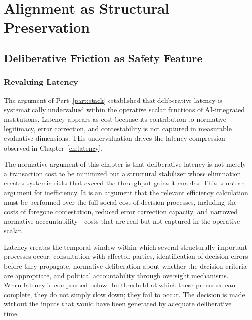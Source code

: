 \documentclass[12pt, oneside]{book}
\theoremstyle{plain}
\theoremstyle{definition}
\theoremstyle{remark}
\theoremstyle{definition}
\begin{document}
\part{Alignment as Structural Preservation}
\label{part:preservation}

\chapter{Deliberative Friction as Safety Feature}
\label{ch:friction}

\section{Revaluing Latency}

The argument of Part~\ref{part:stack} established that deliberative latency is
systematically undervalued within the operative scalar functions of AI-integrated
institutions. Latency appears as cost because its contribution to normative
legitimacy, error correction, and contestability is not captured in measurable
evaluative dimensions. This undervaluation drives the latency compression observed
in Chapter~\ref{ch:latency}.

The normative argument of this chapter is that deliberative latency is not merely
a transaction cost to be minimized but a structural stabilizer whose elimination
creates systemic risks that exceed the throughput gains it enables. This is not an
argument for inefficiency. It is an argument that the relevant efficiency calculation
must be performed over the full social cost of decision processes, including the
costs of foregone contestation, reduced error correction capacity, and narrowed
normative accountability---costs that are real but not captured in the operative
scalar.

Latency creates the temporal window within which several structurally important
processes occur: consultation with affected parties, identification of decision
errors before they propagate, normative deliberation about whether the decision
criteria are appropriate, and political accountability through oversight mechanisms.
When latency is compressed below the threshold at which these processes can complete,
they do not simply slow down; they fail to occur. The decision is made without the
inputs that would have been generated by adequate deliberative time.
\end{document}
